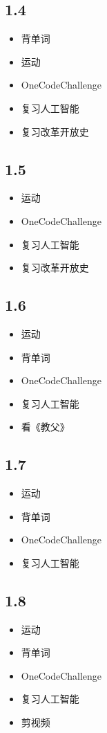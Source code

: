 \documentclass[UTF8]{ctexart}
\begin{document}
\subsection*{1.4}
\begin{itemize}
    \item 背单词
    \item 运动
    \item OneCodeChallenge
    \item 复习人工智能
    \item 复习改革开放史
\end{itemize}

\subsection*{1.5}
\begin{itemize}
    \item 运动
    \item OneCodeChallenge
    \item 复习人工智能
    \item 复习改革开放史
\end{itemize}

\subsection*{1.6}
\begin{itemize}
    \item 运动
    \item 背单词
    \item OneCodeChallenge
    \item 复习人工智能
    \item 看《教父》
\end{itemize}

\subsection*{1.7}
\begin{itemize}
    \item 运动
    \item 背单词
    \item OneCodeChallenge
    \item 复习人工智能
\end{itemize}

\subsection*{1.8}
\begin{itemize}
    \item 运动
    \item 背单词
    \item OneCodeChallenge
    \item 复习人工智能
    \item 剪视频
\end{itemize}
\end{document}
